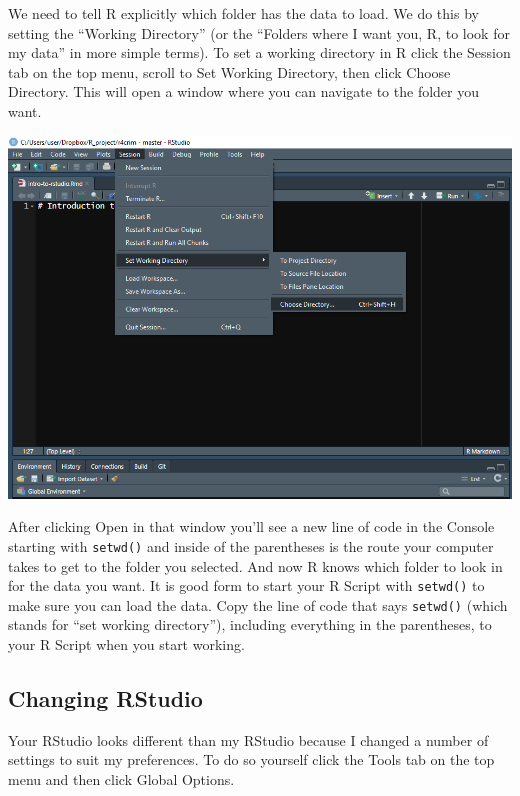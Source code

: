 \documentclass[
]{krantz}
\begin{document}
We need to tell R explicitly which folder has the data to load. We do this by setting the ``Working Directory'' (or the ``Folders where I want you, R, to look for my data'' in more simple terms). To set a working directory in R click the Session tab on the top menu, scroll to Set Working Directory, then click Choose Directory. This will open a window where you can navigate to the folder you want.

\includegraphics{images/rstudio_3.PNG}

After clicking Open in that window you'll see a new line of code in the Console starting with \texttt{setwd()} and inside of the parentheses is the route your computer takes to get to the folder you selected. And now R knows which folder to look in for the data you want. It is good form to start your R Script with \texttt{setwd()} to make sure you can load the data. Copy the line of code that says \texttt{setwd()} (which stands for ``set working directory''), including everything in the parentheses, to your R Script when you start working.

\hypertarget{changing-rstudio}{%
\subsection{Changing RStudio}\label{changing-rstudio}}

Your RStudio looks different than my RStudio because I changed a number of settings to suit my preferences. To do so yourself click the Tools tab on the top menu and then click Global Options.
\end{document}
